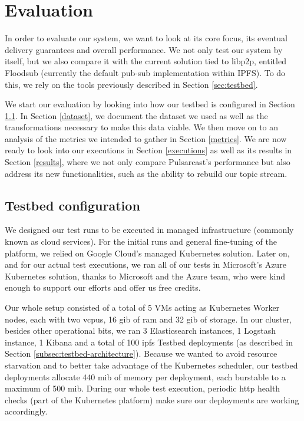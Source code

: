 
\chapter{Evaluation}
\label{chapter:evaluation}


In order to evaluate our system, we want to look at its core focus, its
eventual delivery guarantees and overall performance. We not only test our
system by itself, but we also compare it with the current solution tied to
libp2p, entitled Floodsub (currently the default pub-sub implementation within
IPFS). To do this, we rely on the tools previously described in Section
\ref{sec:testbed}.

We start our evaluation by looking into how our testbed is configured in
Section \ref{testbed-configuration}. In Section \ref{dataset}, we document the
dataset we used as well as the transformations necessary to make this data
viable. We then move on to an analysis of the metrics we intended to gather in
Section \ref{metrics}. We are now ready to look into our executions in Section
\ref{executions} as well as its results in Section \ref{results}, where we not
only compare Pulsarcast's performance but also address its new functionalities,
such as the ability to rebuild our topic stream.

\section{Testbed configuration}\label{testbed-configuration}

We designed our test runs to be executed in managed infrastructure (commonly
known as cloud services). For the initial runs and general fine-tuning of the
platform, we relied on Google Cloud's managed Kubernetes solution. Later on,
and for our actual test executions, we ran all of our tests in Microsoft's
Azure Kubernetes solution, thanks to Microsoft and the Azure team, who were kind
enough to support our efforts and offer us free credits.

Our whole setup consisted of a total of 5 VMs acting as Kubernetes Worker
nodes, each with two \acrshort{vcpu}s, 16 \acrshort{gib} of \acrshort{ram} and
32 \acrshort{gib} of storage. In our cluster, besides other operational bits,
we ran 3 Elasticsearch instances, 1 Logstash instance, 1 Kibana and a total of
100 \acrshort{ipfs} Testbed deployments (as described in Section
\ref{subsec:testbed-architecture}). Because we wanted to avoid resource
starvation and to better take advantage of the Kubernetes scheduler, our
testbed deployments allocate 440 \acrshort{mib} of memory per deployment, each
burstable to a maximum of 500 \acrshort{mib}. During our whole test execution,
periodic \acrshort{http} health checks (part of the Kubernetes platform) make
sure our deployments are working accordingly.


